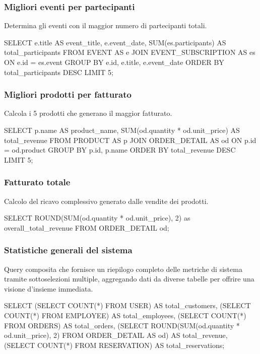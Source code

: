 \documentclass[a4paper,12pt]{report}
\begin{document}
\newpage
\subsubsection{Migliori eventi per partecipanti}
Determina gli eventi con il maggior numero di partecipanti totali.

\begin{sqlcode}[caption={}]
SELECT
  e.title AS event_title,
  e.event_date,
  SUM(es.participants) AS total_participants
FROM EVENT AS e
JOIN EVENT_SUBSCRIPTION AS es ON e.id = es.event
GROUP BY e.id, e.title, e.event_date
ORDER BY total_participants DESC
LIMIT 5;
\end{sqlcode}

\subsubsection{Migliori prodotti per fatturato}
Calcola i 5 prodotti che generano il maggior fatturato.

\begin{sqlcode}[caption={}]
SELECT
  p.name AS product_name,
  SUM(od.quantity * od.unit_price) AS total_revenue
FROM PRODUCT AS p
JOIN ORDER_DETAIL AS od ON p.id = od.product
GROUP BY p.id, p.name
ORDER BY total_revenue DESC
LIMIT 5;
\end{sqlcode}

\subsubsection{Fatturato totale}
Calcolo del ricavo complessivo generato dalle vendite dei prodotti.

\begin{sqlcode}[caption={}]
SELECT ROUND(SUM(od.quantity * od.unit_price), 2) as overall_total_revenue
FROM ORDER_DETAIL od;
\end{sqlcode}

\subsubsection{Statistiche generali del sistema}
Query composita che fornisce un riepilogo completo delle metriche di
sistema tramite sottoselezioni multiple, aggregando dati da diverse
tabelle per offrire una visione d'insieme immediata.

\begin{sqlcode}[caption={}]
SELECT
  (SELECT COUNT(*) FROM USER) AS total_customers,
  (SELECT COUNT(*) FROM EMPLOYEE) AS total_employees,
  (SELECT COUNT(*) FROM ORDERS) AS total_orders,
  (SELECT ROUND(SUM(od.quantity * od.unit_price), 2) FROM ORDER_DETAIL AS od) AS total_revenue,
  (SELECT COUNT(*) FROM RESERVATION) AS total_reservations;
\end{sqlcode}
\end{document}
